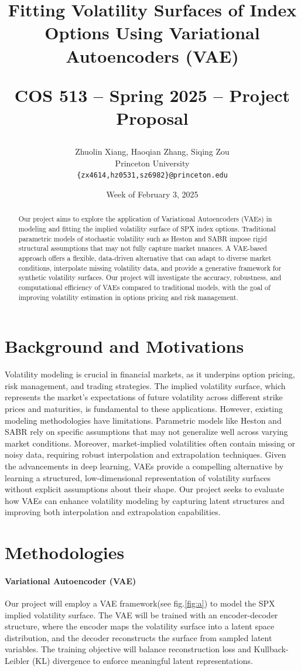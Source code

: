 \documentclass{article}
\title{Fitting Volatility Surfaces of Index Options Using Variational Autoencoders (VAE)\\
\begin{large}
COS 513 -- Spring 2025 -- Project Proposal
\end{large} }
\author{Zhuolin Xiang, Haoqian Zhang, Siqing Zou \\
Princeton University \\
\texttt{\{zx4614,hz0531,sz6982\}@princeton.edu}}
\date{Week of February 3, 2025}
\begin{document}
\maketitle
\begin{abstract}
    Our project aims to explore the application of Variational Autoencoders (VAEs) in modeling and fitting the implied volatility surface of SPX index options. Traditional parametric models of stochastic volatility such as Heston and SABR impose rigid structural assumptions that may not fully capture market nuances. A VAE-based approach offers a flexible, data-driven alternative that can adapt to diverse market conditions, interpolate missing volatility data, and provide a generative framework for synthetic volatility surfaces. Our project will investigate the accuracy, robustness, and computational efficiency of VAEs compared to traditional models, with the goal of improving volatility estimation in options pricing and risk management.
\end{abstract}

\section{Background and Motivations}


Volatility modeling is crucial in financial markets, as it underpins option pricing, risk management, and trading strategies. The implied volatility surface, which represents the market's expectations of future volatility across different strike prices and maturities, is fundamental to these applications. However, existing modeling methodologies have limitations. Parametric models like Heston and SABR rely on specific assumptions that may not generalize well across varying market conditions. Moreover, market-implied volatilities often contain missing or noisy data, requiring robust interpolation and extrapolation techniques. Given the advancements in deep learning, VAEs provide a compelling alternative by learning a structured, low-dimensional representation of volatility surfaces without explicit assumptions about their shape. Our project seeks to evaluate how VAEs can enhance volatility modeling by capturing latent structures and improving both interpolation and extrapolation capabilities.

\section{Methodologies}
\paragraph{Variational Autoencoder (VAE)}
Our project will employ a VAE framework(see fig.\ref{fig:a}) to model the SPX implied volatility surface. The VAE will be trained with an encoder-decoder structure, where the encoder maps the volatility surface into a latent space distribution, and the decoder reconstructs the surface from sampled latent variables. The training objective will balance reconstruction loss and Kullback-Leibler (KL) divergence to enforce meaningful latent representations.
\end{document}
